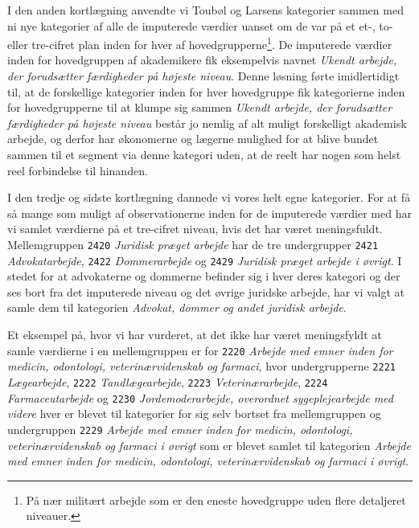 I den anden kortlægning anvendte vi Toubøl og Larsens kategorier sammen med ni nye kategorier af alle de imputerede værdier uanset om de var på et et-, to- eller tre-cifret plan inden for hver af hovedgrupperne\footnote{På nær militært arbejde som er den eneste hovedgruppe uden flere detaljeret niveauer.}. De imputerede værdier inden for hovedgruppen af akademikere fik eksempelvis navnet \emph{Ukendt arbejde, der forudsætter færdigheder på højeste niveau}. Denne løsning førte imidlertidigt til, at de forskellige kategorier inden for hver hovedgruppe fik kategorierne inden for hovedgrupperne til at klumpe sig sammen \emph{Ukendt arbejde, der forudsætter færdigheder på højeste niveau} består jo nemlig af alt muligt forskelligt akademisk arbejde, og derfor har økonomerne og lægerne mulighed for at blive bundet sammen til et segment via denne kategori uden, at de reelt har nogen som helst reel forbindelse til hinanden. 

I den tredje og sidste kortlægning dannede vi vores helt egne kategorier. For at få så mange som muligt af observationerne inden for de imputerede værdier med har vi samlet værdierne på et tre-cifret niveau, hvis det har været meningsfuldt. Mellemgruppen \texttt{2420} \emph{Juridisk præget arbejde} har de tre undergrupper \texttt{2421} \emph{Advokatarbejde}, \texttt{2422} \emph{Dommerarbejde} og \texttt{2429} \emph{Juridisk præget arbejde i øvrigt}. I stedet for at advokaterne og dommerne befinder sig i hver deres kategori og der ses bort fra det imputerede niveau og det øvrige juridske arbejde, har vi valgt at samle dem til kategorien \emph{Advokat, dommer og andet juridisk arbejde}.

Et eksempel på, hvor vi har vurderet, at det ikke har været meningsfyldt at samle værdierne i en mellemgruppen er for \texttt{2220} \emph{Arbejde med emner inden for medicin, odontologi, veterinærvidenskab og farmaci}, hvor undergrupperne \texttt{2221} \emph{Lægearbejde}, \texttt{2222} \emph{Tandlægearbejde}, \texttt{2223} \emph{Veterinærarbejde}, \texttt{2224} \emph{Farmaceutarbejde} og \texttt{2230} \emph{Jordemoderarbejde, overordnet sygeplejearbejde med videre} hver er blevet til kategorier for sig selv bortset fra mellemgruppen og undergruppen \texttt{2229} \emph{Arbejde med emner inden for medicin, odontologi, veterinærvidenskab og farmaci i øvrigt} som er blevet samlet til kategorien \emph{Arbejde med emner inden for medicin, odontologi, veterinærvidenskab og farmaci i øvrigt}.

